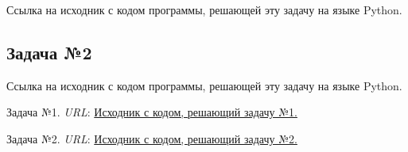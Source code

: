 \documentclass[12pt]{article}
\begin{document}
	Ссылка на исходник с кодом программы, решающей эту задачу на языке Python. \cite{TaskNumber1}
	
	\subsection*{Задача №2}
	Ссылка на исходник с кодом программы, решающей эту задачу на языке Python. \cite{TaskNumber2}
	\newpage
	
	\begin{thebibliography}{99}
		Задача №1. \textit{URL}: \href{https://colab.research.google.com/drive/1Yya--asFdBdXNXN8nocj5L_8NURvFw2t}{Исходник с кодом, решающий задачу №1.}
		
		Задача №2. \textit{URL}:
		\href{https://colab.research.google.com/drive/17D-Thp-Hk-snJIjJTAhnJ815z9UcvgTz#scrollTo=X78LRfPuD_Gj}{Исходник с кодом, решающий задачу №2.}
	\end{thebibliography}
	
\end{document}
